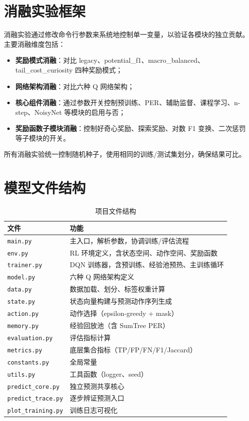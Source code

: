 \documentclass[12pt,a4paper]{article}
\begin{document}
\section{消融实验框架}

消融实验通过修改命令行参数来系统地控制单一变量，以验证各模块的独立贡献。主要消融维度包括：

\begin{itemize}
    \item \textbf{奖励模式消融}：对比 legacy、potential\_f1、macro\_balanced、tail\_cost\_curiosity 四种奖励模式；
    \item \textbf{网络架构消融}：对比六种 Q 网络架构；
    \item \textbf{核心组件消融}：通过参数开关控制预训练、PER、辅助监督、课程学习、n-step、NoisyNet 等模块的启用与否；
    \item \textbf{奖励函数子模块消融}：控制好奇心奖励、探索奖励、对数 F1 变换、二次惩罚等子模块的开关。
\end{itemize}

所有消融实验统一控制随机种子，使用相同的训练/测试集划分，确保结果可比。

\section{模型文件结构}

\begin{table}[H]
\centering
\caption{项目文件结构}
\begin{tabular}{ll}
\toprule
\textbf{文件} & \textbf{功能} \\
\midrule
\texttt{main.py} & 主入口，解析参数，协调训练/评估流程 \\
\texttt{env.py} & RL 环境定义，含状态空间、动作空间、奖励函数 \\
\texttt{trainer.py} & DQN 训练器，含预训练、经验池预热、主训练循环 \\
\texttt{model.py} & 六种 Q 网络架构定义 \\
\texttt{data.py} & 数据加载、划分、标签权重计算 \\
\texttt{state.py} & 状态向量构建与预测动作序列生成 \\
\texttt{action.py} & 动作选择（epsilon-greedy + mask） \\
\texttt{memory.py} & 经验回放池（含 SumTree PER） \\
\texttt{evaluation.py} & 评估指标计算 \\
\texttt{metrics.py} & 底层集合指标（TP/FP/FN/F1/Jaccard） \\
\texttt{constants.py} & 全局常量 \\
\texttt{utils.py} & 工具函数（logger、seed） \\
\texttt{predict\_core.py} & 独立预测共享核心 \\
\texttt{predict\_trace.py} & 逐步辨证预测入口 \\
\texttt{plot\_training.py} & 训练日志可视化 \\
\bottomrule
\end{tabular}
\end{table}
\end{document}
